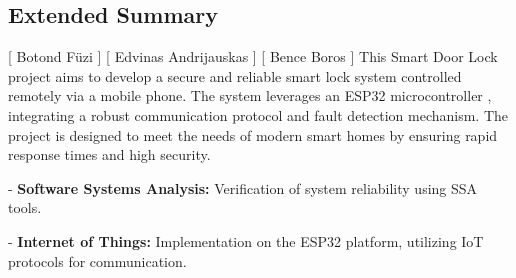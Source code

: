 \subsection*{Extended Summary}
[ Botond Füzi ] [ Edvinas Andrijauskas ] [ Bence Boros ] 
\newline
This Smart Door Lock project aims to develop a secure and reliable smart lock system controlled remotely via a mobile phone. The system leverages an ESP32 microcontroller \cite{esp32-datasheet}, integrating a robust communication protocol and fault detection mechanism. The project is designed to meet the needs of modern smart homes by ensuring rapid response times and high security.

- \textbf{Software Systems Analysis:} Verification of system reliability using SSA tools.

- \textbf{Internet of Things:} Implementation on the ESP32 platform, utilizing IoT protocols for communication.